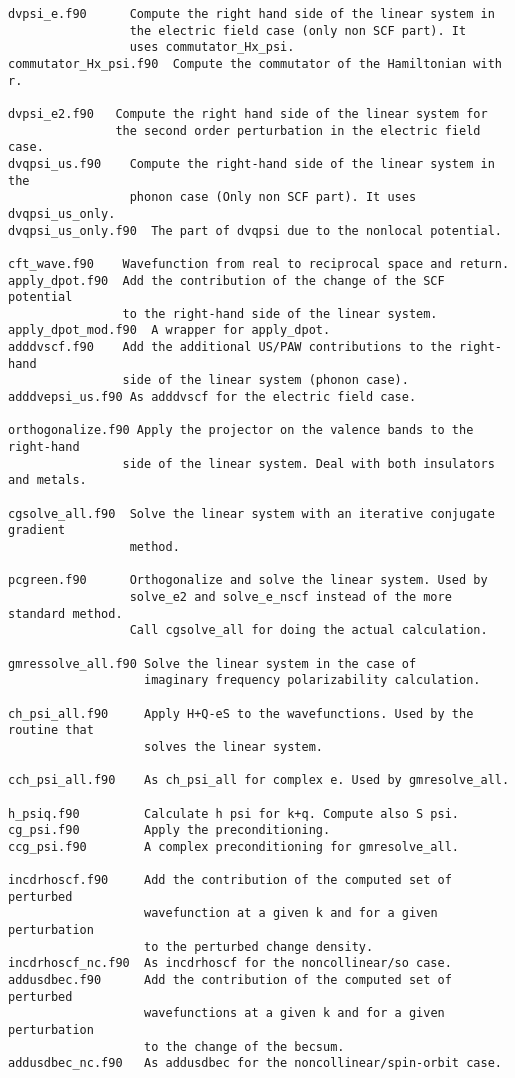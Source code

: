 \documentclass[12pt,a4paper]{article}
\begin{document}
\begin{verbatim}
dvpsi_e.f90      Compute the right hand side of the linear system in
                 the electric field case (only non SCF part). It
                 uses commutator_Hx_psi.
commutator_Hx_psi.f90  Compute the commutator of the Hamiltonian with r.       

dvpsi_e2.f90   Compute the right hand side of the linear system for
               the second order perturbation in the electric field case.                   
dvqpsi_us.f90    Compute the right-hand side of the linear system in the
                 phonon case (Only non SCF part). It uses dvqpsi_us_only.
dvqpsi_us_only.f90  The part of dvqpsi due to the nonlocal potential.          

cft_wave.f90    Wavefunction from real to reciprocal space and return.
apply_dpot.f90  Add the contribution of the change of the SCF potential  
                to the right-hand side of the linear system.               
apply_dpot_mod.f90  A wrapper for apply_dpot.
adddvscf.f90    Add the additional US/PAW contributions to the right-hand
                side of the linear system (phonon case).
adddvepsi_us.f90 As adddvscf for the electric field case.

orthogonalize.f90 Apply the projector on the valence bands to the right-hand
                side of the linear system. Deal with both insulators and metals.

cgsolve_all.f90  Solve the linear system with an iterative conjugate gradient
                 method.                

pcgreen.f90      Orthogonalize and solve the linear system. Used by 
                 solve_e2 and solve_e_nscf instead of the more standard method.
                 Call cgsolve_all for doing the actual calculation.

gmressolve_all.f90 Solve the linear system in the case of 
                   imaginary frequency polarizability calculation.           

ch_psi_all.f90     Apply H+Q-eS to the wavefunctions. Used by the routine that 
                   solves the linear system.

cch_psi_all.f90    As ch_psi_all for complex e. Used by gmresolve_all.

h_psiq.f90         Calculate h psi for k+q. Compute also S psi.              
cg_psi.f90         Apply the preconditioning.               
ccg_psi.f90        A complex preconditioning for gmresolve_all.

incdrhoscf.f90     Add the contribution of the computed set of perturbed
                   wavefunction at a given k and for a given perturbation
                   to the perturbed change density.              
incdrhoscf_nc.f90  As incdrhoscf for the noncollinear/so case.         
addusdbec.f90      Add the contribution of the computed set of perturbed
                   wavefunctions at a given k and for a given perturbation
                   to the change of the becsum.               
addusdbec_nc.f90   As addusdbec for the noncollinear/spin-orbit case.


\end{verbatim}
\end{document}
